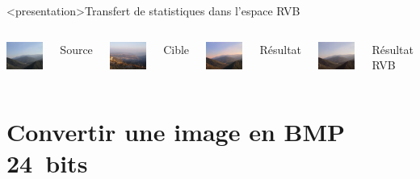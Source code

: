 \begin{frame}<presentation>{Transfert de statistiques dans l'espace RVB}
  \begin{columns}
    \column{6cm}
    \centering
    \includegraphics[width=4cm]{DSC04659}

    Source

    \vspace{2ex}
    \includegraphics[width=4cm]{P2130173}

    Cible

    \column{6cm}
    \centering
    \includegraphics[width=4cm]{srcDSC04659tgtP2130173}

    Résultat \lAB

    \vspace{2ex}
    \includegraphics[width=4cm]{RGBsrcDSC04659tgtP2130173}

    Résultat RVB
  \end{columns}
\end{frame}


\section<article>{Convertir une image en BMP 24~bits}
\label{sec:conversion_bmp24}

